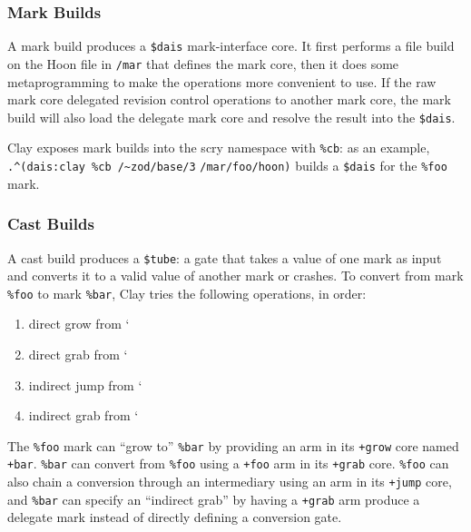 \documentclass[twoside]{article}
\begin{document}
\subsubsection{Mark Builds}

A mark build produces a \lstinline[style=inlinecode]{$dais} mark-interface core. It first performs a file build on the Hoon file in \lstinline[style=inlinecode]{/mar} that defines the mark core, then it does some metaprogramming to make the operations more convenient to use. If the raw mark core delegated revision control operations to another mark core, the mark build will also load the delegate mark core and resolve the result into the \lstinline[style=inlinecode]{$dais}.

\sloppy
Clay exposes mark builds into the scry \mbox{namespace} with \lstinline[style=inlinecode]{%cb}: as an example, \lstinline[style=inlinecode]{.^(dais:clay %cb /~zod/base/3} \lstinline[style=inlinecode]{/mar/foo/hoon)} builds a \lstinline[style=inlinecode]{$dais} for the \lstinline[style=inlinecode]{%foo} mark.

\subsubsection{Cast Builds}

A cast build produces a \lstinline[style=inlinecode]{$tube}: a gate that takes a value of one mark as input and converts it to a valid value of another mark or crashes. To convert from mark \lstinline[style=inlinecode]{%foo} to mark \lstinline[style=inlinecode]{%bar}, Clay tries the following operations, in order:

\begin{enumerate}
  \item  direct grow from `%
  \item  direct grab from `%
  \item  indirect jump from `%
  \item  indirect grab from `%
\end{enumerate}

The \lstinline[style=inlinecode]{%foo} mark can ``grow to'' \lstinline[style=inlinecode]{%bar} by providing an arm in its \lstinline[style=inlinecode]{+grow} core named \lstinline[style=inlinecode]{+bar}. \lstinline[style=inlinecode]{%bar} can convert from \lstinline[style=inlinecode]{%foo} using a \lstinline[style=inlinecode]{+foo} arm in its \lstinline[style=inlinecode]{+grab} core. \lstinline[style=inlinecode]{%foo} can also chain a conversion through an intermediary using an arm in its \lstinline[style=inlinecode]{+jump} core, and \lstinline[style=inlinecode]{%bar} can specify an ``indirect grab'' by having a \lstinline[style=inlinecode]{+grab} arm produce a delegate mark instead of directly defining a conversion gate.
\end{document}
